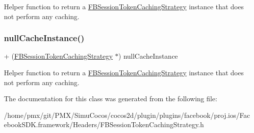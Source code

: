 Helper function to return a \hyperlink{interfaceFBSessionTokenCachingStrategy}{F\+B\+Session\+Token\+Caching\+Strategy} instance that does not perform any caching. \mbox{\label{interfaceFBSessionTokenCachingStrategy_a97f1da9c8423d4e6bbca2241bd894032}} 
\subsubsection{\texorpdfstring{null\+Cache\+Instance()}{nullCacheInstance()}\hspace{0.1cm}{\footnotesize\ttfamily [5/5]}}
{\footnotesize\ttfamily + (\hyperlink{interfaceFBSessionTokenCachingStrategy}{F\+B\+Session\+Token\+Caching\+Strategy} $\ast$) null\+Cache\+Instance \begin{DoxyParamCaption}{ }\end{DoxyParamCaption}}

Helper function to return a \hyperlink{interfaceFBSessionTokenCachingStrategy}{F\+B\+Session\+Token\+Caching\+Strategy} instance that does not perform any caching. 

The documentation for this class was generated from the following file\+:\begin{DoxyCompactItemize}
\item 
/home/pmx/git/\+P\+M\+X/\+Simu\+Cocos/cocos2d/plugin/plugins/facebook/proj.\+ios/\+Facebook\+S\+D\+K.\+framework/\+Headers/F\+B\+Session\+Token\+Caching\+Strategy.\+h\end{DoxyCompactItemize}
